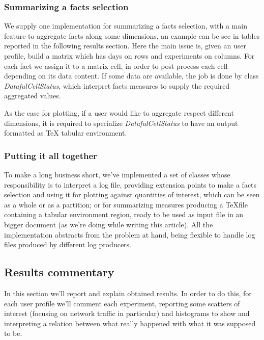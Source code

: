 \documentclass[10pt,a4paper]{article}
\begin{document}
    \subsubsection{Summarizing a facts selection}

    We supply one implementation for summarizing a facts selection,
    with a main feature to aggregate facts along some dimensions, an
    example can be see in tables reported in the following results
    section. Here the main issue is, given an user profile, build a
    matrix which has days on rows and experiments on columns. For each
    fact we assign it to a matrix cell, in order to post process each
    cell depending on its data content. If some data are available,
    the job is done by class \emph{DatafulCellStatus}, which interpret
    facts measures to supply the required aggregated values.

    As the case for plotting, if a user would like to aggregate
    respect different dimensions, it is required to specialize
    \emph{DatafulCellStatus} to have an output formatted as \TeX
    tabular environment.

    \subsubsection{Putting it all together}
    
    To make a long business short, we've implemented a set of classes
    whose responsibility is to interpret a log file, providing
    extension points to make a facts selection and using it for
    plotting against quantities of interest, which can be seen as a
    whole or as a partition; or for summarizing measures producing a
    \TeX file containing a tabular environment region, ready to be
    used as input file in an bigger document (as we're doing while
    writing this article). All the implementation abstracts from the
    problem at hand, being flexible to handle log files produced by
    different log producers.
    
    \newpage

    \subsection{Results commentary}

    In this section we'll report and explain obtained results. In
    order to do this, for each user profile we'll comment each
    experiment, reporting some scatters of interest (focusing on
    network traffic in particular) and histograms to show and
    interpreting a relation between what really happened with what it
    was supposed to be. 
\end{document}
